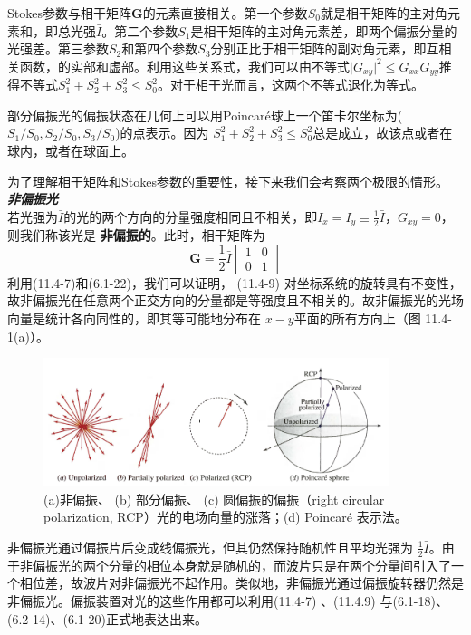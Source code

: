 \documentclass[UTF8]{ctexart}
\numberwithin{figure}{subsection}
\numberwithin{table}{subsection}
\begin{document}
Stokes参数与相干矩阵$\mathbf{G}$的元素直接相关。第一个参数$S_0$就是相干矩阵的主对角元素和，即总光强$\bar{I}$。第二个参数$S_1$是相干矩阵的主对角元素差，即两个偏振分量的光强差。第三参数$S_2$和第四个参数$S_3$分别正比于相干矩阵的副对角元素，即互相关函数，的实部和虚部。利用这些关系式，我们可以由不等式$\lvert G_{xy} \rvert^2 \leq G_{xx}G_{yy}$推得不等式$S_1^2 + S_2^2 + S_3^2 \leq S_0^2$。对于相干光而言，这两个不等式退化为等式。
\par 部分偏振光的偏振状态在几何上可以用Poincar\'{e}球上一个笛卡尔坐标为($S_1 / S_0, S_2 / S_0, S_3 / S_0$)的点表示。因为 $S_1^2 + S_2^2 + S_3^2 \leq S_0^2$总是成立，故该点或者在球内，或者在球面上。
\par 为了理解相干矩阵和Stokes参数的重要性，接下来我们会考察两个极限的情形。
\bigbreak\noindent\textcolor{ksc}{\textbf{\textsl{非偏振光}}}\\
若光强为$\bar{I}$的光的两个方向的分量强度相同且不相关，即$I_x = I_y \equiv \frac{1}{2}\bar{I}$，$G_{xy} = 0$，则我们称该光是 \textbf{非偏振的}。此时，相干矩阵为
\begin{equation}
\mathbf{G} = \frac{1}{2}\bar{I}
\begin{bmatrix}
1 & 0 \\
0 & 1
\end{bmatrix}
\end{equation}
利用(11.4-7)和(6.1-22)，我们可以证明， (11.4-9) 对坐标系统的旋转具有不变性，故非偏振光在任意两个正交方向的分量都是等强度且不相关的。故非偏振光的光场向量是统计各向同性的，即其等可能地分布在 $x-y$平面的所有方向上（图 11.4-1(a)）。
\begin{figure}[H]
\centering
\includegraphics[width=0.9\textwidth]{11_4_1.PNG}
\caption{(a)非偏振、 (b) 部分偏振、 (c) 圆偏振的偏振（right circular polarization, RCP）光的电场向量的涨落；(d) Poincar\'{e} 表示法。}
\label{fig: 11_4_1}
\end{figure}
\par 非偏振光通过偏振片后变成线偏振光，但其仍然保持随机性且平均光强为 $\frac{1}{2}\bar{I}$。由于非偏振光的两个分量的相位本身就是随机的，而波片只是在两个分量间引入了一个相位差，故波片对非偏振光不起作用。类似地，非偏振光通过偏振旋转器仍然是非偏振光。偏振装置对光的这些作用都可以利用(11.4-7) 、(11.4.9) 与(6.1-18)、 (6.2-14)、(6.1-20)正式地表达出来。
\end{document}
